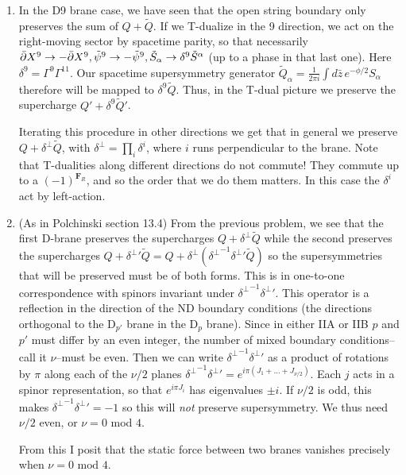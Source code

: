 \documentclass[11pt, class=article, crop=false]{standalone}
\begin{document}
\begin{enumerate}
	\item In the D9 brane case, we have seen that the open string boundary only preserves the sum of $Q + \tilde Q$. If we T-dualize in the 9 direction, we act on the right-moving sector by spacetime parity, so that necessarily $\bar {\partial} X^9 \to - \bar {\partial} X^9, \tilde \psi^9 \to - \tilde \psi^9, \tilde S_\alpha \to \delta^9 \tilde S^\alpha$ (up to a phase in that last one). Here $\delta^9 = \Gamma^9 \Gamma^{11}$. Our spacetime supersymmetry generator $\tilde Q_\alpha = \frac{1}{2\pi i} \int d\bar z\, e^{-\phi/2} S_{\alpha}$ therefore will be mapped to $\delta^9 \tilde Q$. Thus, in the T-dual picture we preserve the supercharge $Q' + \delta^9 \tilde Q'$.
	
	Iterating this procedure in other directions we get that in general we preserve $Q + \delta^\perp \tilde Q$, with $\delta^\perp = \prod_{i} \delta^i$, where $i$ runs perpendicular to the brane. Note that T-dualities along different directions do not commute! They commute up to a $(-1)^{\mathbf{F}_R}$, and so the order that we do them matters. In this case the $\delta^i$ act by left-action.
	
	\item (As in Polchinski section 13.4) From the previous problem, we see that the first D-brane preserves the supercharges $Q + \delta^\perp \tilde Q$ while the second preserves the supercharges $Q + {\delta^\perp}' \tilde Q = Q + \delta^\perp ({\delta^\perp}^{-1} {\delta^\perp}' \tilde Q)$ so the supersymmetries that will be preserved must be of both forms. This is in one-to-one correspondence with spinors invariant under ${\delta^\perp}^{-1} {\delta^\perp}'$. This operator is a reflection in the direction of the ND boundary conditions (the directions orthogonal to the D$_{p'}$ brane in the D$_p$ brane). Since in either IIA or IIB $p$ and $p'$ must differ by an even integer, the number of mixed boundary conditions--call it $\nu$--must be even. Then we can write ${\delta^\perp}^{-1} {\delta^\perp}'$ as a product of rotations by $\pi$ along each of the $\nu/2$ planes ${\delta^\perp}^{-1} {\delta^\perp}' = e^{i \pi (J_1 + \dots + J_{\nu/2})}$. Each $j$ acts in a spinor representation, so that $e^{i \pi J_i}$ has eigenvalues $\pm i$. If $\nu/2$ is odd, this makes ${\delta^\perp}^{-1} {\delta^\perp}' = -1$ so this will \emph{not} preserve supersymmetry. We thus need $\nu/2$ even, or $\nu = 0$ mod $4$.
	
	
	From this I posit that the static force between two branes vanishes precisely when $\nu = 0 \text{ mod } 4$.
	

\end{enumerate}
\end{document}
